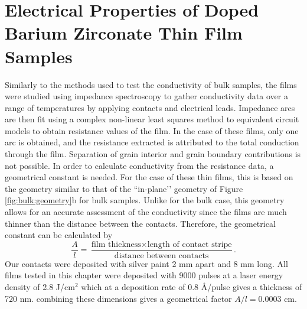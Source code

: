 \vspace{12pt}
\section{Electrical Properties of Doped Barium Zirconate Thin Film Samples}
Similarly to the methods used to test the conductivity of bulk samples, the films were studied using impedance spectroscopy to gather conductivity data over a range of temperatures by applying contacts and electrical leads. Impedance arcs are then fit using a complex non-linear least squares method to equivalent circuit models to obtain resistance values of the film. In the case of these films, only one arc is obtained, and the resistance extracted is attributed to the total conduction through the film. Separation of grain interior and grain boundary contributions is not possible. In order to calculate conductivity from the resistance data, a geometrical constant is needed. For the case of these thin films, this is based on the geometry similar to that of the ``in-plane’’ geometry of Figure \ref{fig:bulk:geometry}b for bulk samples. Unlike for the bulk case, this geometry allows for an accurate assessment of the conductivity since the films are much thinner than the distance between the contacts. Therefore, the geometrical constant can be calculated by
\begin{equation}
    \frac{A}{l} = \frac{\textrm{film thickness} \times \textrm{length of contact stripe}}{\textrm{distance between contacts}}.
\end{equation}
Our contacts were deposited with silver paint 2 mm apart and 8 mm long. All films tested in this chapter were deposited with 9000 pulses at a laser energy density of 2.8 J/cm$^2$ which at a deposition rate of 0.8 \AA/pulse gives a thickness of 720 nm. combining these dimensions gives a geometrical factor $A/l=0.0003$ cm. 

